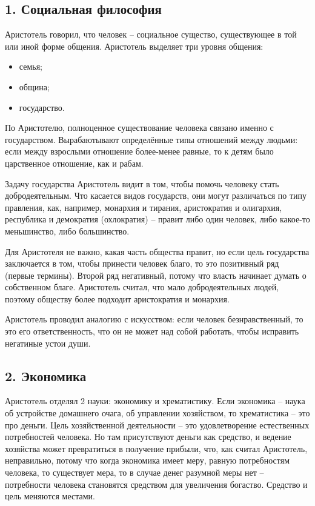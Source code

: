 \documentclass[a4paper, 12pt]{book} %
\begin{document}
\subsection*{1. Социальная философия}
Аристотель говорил, что человек -- социальное существо, существующее в той или иной форме общения.
Аристотель выделяет три уровня общения:
\begin{itemize}
\item семья;
\item община;
\item государство.
\end{itemize}
По Аристотелю, полноценное существование человека связано именно с государством. Вырабаютывают определённые типы отношений между людьми: если между взрослыми отношение более-менее равные, то к детям было царственное отношение, как и рабам. 

Задачу государства Аристотель видит в том, чтобы помочь человеку стать добродеятельным.
Что касается видов государств, они могут различаться по типу правления, как, например, монархия и тирания, аристократия и олигархия, республика и демократия (охлократия) -- правит либо один человек, либо какое-то меньшинство, либо большинство.

Для Аристотеля не важно, какая часть общества правит, но если цель государства заключается в том, чтобы принести человек благо, то это позитивный ряд (первые термины). Второй ряд негативный, потому что власть начинает думать о собственном благе. Аристотель считал, что мало добродеятельных людей, поэтому обществу более подходит аристократия и монархия.

Аристотель проводил аналогию с искусством: если человек безнравственный, то это его ответственность, что он не может над собой работать, чтобы исправить негатиные устои души.

\subsection*{2. Экономика}

Аристотель отделял 2 науки: экономику и хрематистику. Если экономика -- наука об устройстве домашнего очага, об управлении хозяйством, то хрематистика -- это про деньги. Цель хозяйственной деятельности -- это удовлетворение естественных потребностей человека. Но там присутствуют деньги как средство, и ведение хозяйства может превратиться в получение прибыли, что, как считал Аристотель, неправильно, потому что когда экономика имеет меру, равную потребностям человека, то существует мера, то в случае денег разумной меры нет -- потребности человека становятся средством для увеличения богаство. Средство и цель меняются местами.
\end{document}
